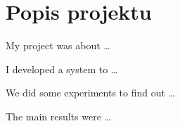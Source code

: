\section{Popis projektu}

My project was about \ldots

I developed a system to \ldots

We did some experiments to find out \ldots

The main results were \ldots